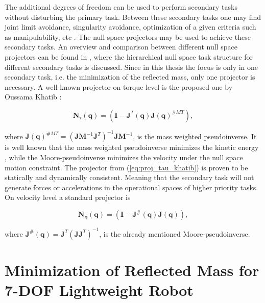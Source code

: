 The additional degrees of freedom can be used to perform secondary tasks without disturbing the primary task. Between these secondary tasks one may find joint limit avoidance, singularity avoidance, optimization of a given criteria such as manipulability, etc  \cite{redundancy_1}. 
The null space projectors may be used to achieve these secondary tasks. An overview and comparison between different null space projectors can be found in \cite{JLA_5}, where the hierarchical null space task structure for different secondary tasks is discussed. Since in this thesis the focus is only in  one secondary task, i.e. the minimization of the reflected mass, only one projector is necessary. 
A well-known projector on torque level is the proposed one by Oussama Khatib \cite{khatib1995}:



\begin{equation}
	\mathbf{N}_{\tau}(\mathbf{q}) = \left(\mathbf{I}-\mathbf{J}^{T}(\mathbf{q})\mathbf{J}(\mathbf{q})^{\#MT}\right),
	\label{eq:proj_tau_khatib}
\end{equation}

where $\mathbf{J}(\mathbf{q})^{\#MT} = (\mathbf{J}\mathbf{ M}^{-1} \mathbf{J}^T)^{-1} \mathbf{J} \mathbf{M}^{-1}$, is the mass weighted pseudoinverse. It is well known that the mass weighted pseudoinverse minimizes the kinetic energy \cite{khatib1995}, while the Moore-pseudoinverse minimizes the velocity under the null space motion constraint. The projector from (\ref{eq:proj_tau_khatib}) is proven to be statically and dynamically consistent. Meaning that the secondary task will not generate forces or accelerations in the operational spaces of higher priority tasks.
On velocity level a standard projector is 

\begin{equation}
\mathbf{N}_{\mathbf{\dot{q}}}(\mathbf{q}) = \left(\mathbf{I}-\mathbf{J}^{\#}(\mathbf{q})\mathbf{J}(\mathbf{q})\right),
\label{eq:proj_dq_khatib}
\end{equation}

where $\mathbf{J}^{\#}(\mathbf{q}) = \mathbf{J}^{T} (\mathbf{J} \mathbf{J}^T)^{-1} $, is the already mentioned Moore-pseudoinverse.




\section{Minimization of Reflected Mass for 7-DOF Lightweight Robot}
\label{sec:control_LWR}

